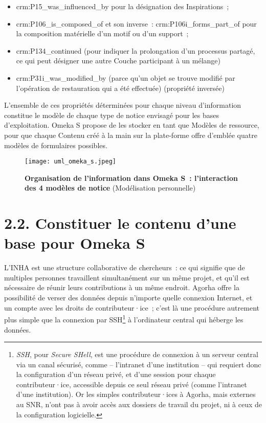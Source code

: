 \documentclass[a4paper,12pt, twoside]{book}
\begin{document}
\begin{itemize}
    \item \textsf{crm:P15\_was\_influenced\_by} pour la désignation des \textsf{Inspirations}~;\\

    \item \textsf{crm:P106\_is\_composed\_of} et son inverse~: \textsf{crm:P106i\_forms\_part\_of} pour la composition matérielle d’un motif ou d’un support~;\\

    \item \textsf{crm:P134\_continued} (pour indiquer la prolongation d’un processus partagé, ce qui peut désigner une autre Couche participant à un mélange)\\

    \item \textsf{crm:P31i\_was\_modified\_by} (parce qu’un objet se trouve modifié par l’opération de restauration qui a été effectuée) (propriété inversée)
\end{itemize}

L’ensemble de ces propriétés déterminées pour chaque niveau d’information constitue le modèle de chaque type de notice envisagé pour les bases d’exploitation. Omeka S propose de les stocker en tant que Modèles de ressource, pour que chaque \textsf{Contenu} créé à la main sur la plate-forme offre d’emblée quatre modèles de formulaires possibles.

\begin{figure}[!h]
    \centering
    \texttt{[image: uml\_omeka\_s.jpeg]}
    \caption*{\textbf{Organisation de l'information dans Omeka S~: l'interaction des 4 modèles de notice}
(Modélisation personnelle)}
    \label{Schématisation de l'information pour Omeka S}
\end{figure}

\pagebreak

\section*{2.2. Constituer le contenu d’une base pour Omeka S}

L’INHA est une structure collaborative de chercheurs~: ce qui signifie que de multiples personnes travaillent simultanément sur un même projet, et qu’il est nécessaire de réunir leurs contributions à un même endroit. Agorha offre la possibilité de verser des données depuis n’importe quelle connexion Internet, et un compte avec les droits de contributeur·ice~; c’est là une procédure autrement plus simple que la connexion par SSH\footnote{\emph{SSH}, pour \emph{Secure SHell}, est une procédure de connexion à un serveur central via un canal sécurisé, comme – l’intranet d’une institution – qui requiert donc la configuration d’un réseau privé, et d’une session pour chaque contributeur·ice, accessible depuis ce seul réseau privé (comme l’intranet d’une institution). Or les simples contributeur·ices à Agorha, mais externes au SNR, n’ont pas à avoir accès aux dossiers de travail du projet, ni à ceux de la configuration logicielle.} à l’ordinateur central qui héberge les données.
\end{document}
